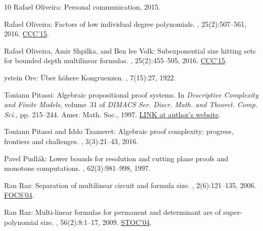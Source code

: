 \documentclass[11pt]{article}
\numberwithin{equation}{section}
\theoremstyle{definition}
\theoremstyle{plain}
\begin{document}
\begin{thebibliography}{10}
{\sc Rafael Oliveira}: Personal communication, 2015.

{\sc Rafael Oliveira}: Factors of low individual degree polynomials.
, 25(2):507--561, 2016.
\newblock \prelim \href{https://doi.org/10.4230/LIPIcs.CCC.2015.198}{CCC'15}.

{\sc Rafael Oliveira, Amir Shpilka, and Ben lee Volk}: Subexponential size
  hitting sets for bounded depth multilinear formulas.
, 25(2):455--505, 2016.
\newblock \prelim \href{https://doi.org/10.4230/LIPIcs.CCC.2015.304}{CCC'15}.

{\sc {\O}ystein Ore}: {\"U}ber h{\"o}here {K}ongruenzen.
, 7(15):27, 1922.

{\sc Toniann Pitassi}: Algebraic propositional proof systems.
\newblock In {\em Descriptive Complexity and Finite Models}, volume~31 of {\em
  DIMACS Ser. Discr. Math. and Theoret. Comp. Sci.}, pp. 215--244. Amer. Math.
  Soc., 1997.
\newblock
  \href{https://www.cs.toronto.edu/~toni/Papers/pitassi-algebraic.ps}{LINK at
  author's website}.

{\sc Toniann Pitassi and Iddo Tzameret}: Algebraic proof complexity: progress,
  frontiers and challenges.
, 3(3):21--43, 2016.
\newblock [\epfmtdoi{10.1145/2984450.2984455}]

{\sc Pavel Pudl{\'{a}}k}: Lower bounds for resolution and cutting plane proofs
  and monotone computations.
, 62(3):981--998, 1997.
\newblock [\epfmtdoi{10.2307/2275583}]

{\sc Ran Raz}: Separation of multilinear circuit and formula size.
, 2(6):121--135, 2006.
\newblock \prelim \href{https://doi.org/10.1109/FOCS.2004.42}{FOCS'04}.

{\sc Ran Raz}: Multi-linear formulas for permanent and determinant are of
  super-polynomial size.
, 56(2):8:1--17, 2009.
\newblock \prelim \href{https://doi.org/10.1145/1007352.1007353}{STOC'04}.


\end{thebibliography}
\end{document}
